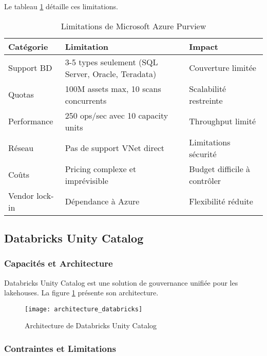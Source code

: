 Le tableau \ref{tab:limitations_purview} détaille ces limitations.

\begin{table}[htpb]
\centering
\caption{Limitations de Microsoft Azure Purview}
\label{tab:limitations_purview}
\begin{tabular}{|p{}|p{}|p{}|}
\hline
\textbf{Catégorie} & \textbf{Limitation} & \textbf{Impact} \\
\hline
Support BD & 3-5 types seulement (SQL Server, Oracle, Teradata) & Couverture limitée \\
\hline
Quotas & 100M assets max, 10 scans concurrents & Scalabilité restreinte \\
\hline
Performance & 250 ops/sec avec 10 capacity units & Throughput limité \\
\hline
Réseau & Pas de support VNet direct & Limitations sécurité \\
\hline
Coûts & Pricing complexe et imprévisible & Budget difficile à contrôler \\
\hline
Vendor lock-in & Dépendance à Azure & Flexibilité réduite \\
\hline
\end{tabular}
\end{table}

\subsection{Databricks Unity Catalog}

\subsubsection{Capacités et Architecture}

Databricks Unity Catalog est une solution de gouvernance unifiée pour les lakehouses. La figure \ref{fig:architecture_databricks} présente son architecture.

\begin{figure}[htpb]
\centering
\texttt{[image: architecture\_databricks]}
\caption{Architecture de Databricks Unity Catalog}
\label{fig:architecture_databricks}
\end{figure}

\subsubsection{Contraintes et Limitations}

